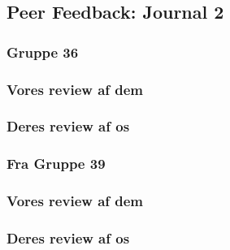 \subsection{Peer Feedback: Journal 2}
\clearpage
\subsubsection{Gruppe 36}
\subsubsection*{Vores review af dem}

\subsubsection*{Deres review af os}


\clearpage
\subsubsection{Fra Gruppe 39}

\subsubsection*{Vores review af dem}
% 
\subsubsection*{Deres review af os}
